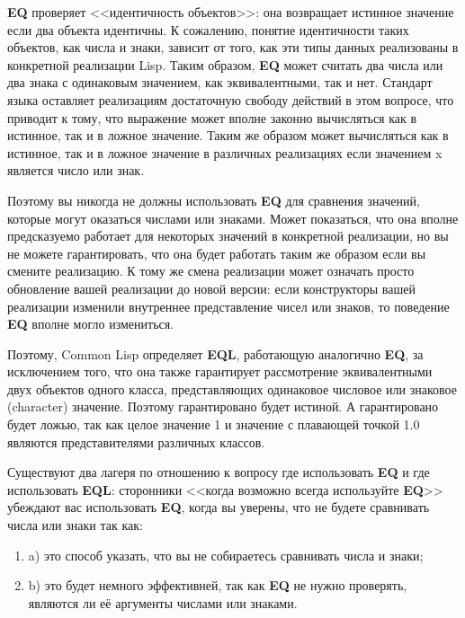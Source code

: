 \textbf{EQ} проверяет <<идентичность объектов>>: она возвращает истинное значение если два
объекта идентичны. К сожалению, понятие идентичности таких объектов, как числа и знаки,
зависит от того, как эти типы данных реализованы в конкретной реализации Lisp. Таким
образом, \textbf{EQ} может считать два числа или два знака с одинаковым значением, как
эквивалентными, так и нет. Стандарт языка оставляет реализациям достаточную свободу
действий в этом вопросе, что приводит к тому, что выражение  может вполне
законно вычисляться как в истинное, так и в ложное значение. Таким же образом  может вычисляться как в истинное, так и в ложное значение в различных реализациях
если значением x является число или знак.

Поэтому вы никогда не должны использовать \textbf{EQ} для сравнения значений, которые
могут оказаться числами или знаками. Может показаться, что она вполне предсказуемо
работает для некоторых значений в конкретной реализации, но вы не можете гарантировать,
что она будет работать таким же образом если вы смените реализацию. К тому же смена
реализации может означать просто обновление вашей реализации до новой версии: если
конструкторы вашей реализации изменили внутреннее представление чисел или знаков, то
поведение \textbf{EQ} вполне могло измениться.

Поэтому, Common Lisp определяет \textbf{EQL}, работающую аналогично \textbf{EQ}, за
исключением того, что она также гарантирует рассмотрение эквивалентными двух объектов
одного класса, представляющих одинаковое числовое или знаковое (character)
значение. Поэтому  гарантировано будет истиной. А 
гарантировано будет ложью, так как целое значение 1 и значение с плавающей точкой 1.0
являются представителями различных классов.

Существуют два лагеря по отношению к вопросу где использовать \textbf{EQ} и где
использовать \textbf{EQL}: сторонники <<когда возможно всегда используйте \textbf{EQ}>>
убеждают вас использовать \textbf{EQ}, когда вы уверены, что не будете сравнивать числа
или знаки так как:

\begin{enumerate}
\item a) это способ указать, что вы не собираетесь сравнивать числа и знаки; 

\item b) это будет немного эффективней, так как \textbf{EQ} не нужно проверять, являются
  ли её аргументы числами или знаками.
\end{enumerate}

